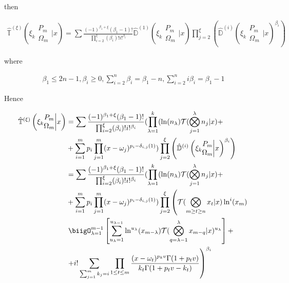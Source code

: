 then 

\begin{align}
      \hat{\mathbb{T}}^{(\xi)}\left( \xi_k \begin{matrix} 
      P_m \\ \Omega_m \end{matrix} \bigg| x  \right) = \sum
      \frac{(-1)^{\beta_1 + \xi}(\beta_1 -1)!}{\prod_{i=2}^\xi 
      (\beta_i)!i!^{\beta_i}} \hat{\mathbb{D}}^{(1)}\left( \xi_k 
      \begin{matrix} P_m \\ \Omega_m \end{matrix} \bigg| x  \right)
      \prod_{j=2}^\xi \left(\hat{\mathbb{D}}^{(i)}\left( \xi_k 
      \begin{matrix} P_m \\ \Omega_m \end{matrix} \bigg| x  
      \right)^{\beta_i}\right)
\end{align}

where

\begin{align}
      \beta_1 \leq 2n-1,  \beta_i \geq 0,  \sum_{i=2}^n 
      \beta_i = \beta_1 - n,   \sum_{i=2}^n i \beta_i = \beta_1 - 1
\end{align}

Hence

\begin{align}
      \hat{\mathbb{T}}^{(\xi)}\left( \xi_k \begin{matrix} P_m \\ 
      \Omega_m \end{matrix} \bigg| x  \right) &= \sum \frac{(-1)^{
      \beta_1 + \xi}(\beta_1 -1)!}{\prod_{i=2}^\xi (\beta_i)!i!^{
      \beta_i}} (\prod_{\lambda = 1}^k (\ln(n_\lambda) \mathcal{T}(
      \bigotimes_{j=1}^\lambda n_j |x) + \\
      &+\sum_{i=1}^m p_i \prod_{j=1}^m (x-\omega_j)^{p_i-\delta_{i,
      j}(1)} )\prod_{j=2}^\xi \left(\hat{\mathbb{D}}^{(i)}\left(
      \xi_k \begin{matrix} P_m \\ \Omega_m \end{matrix} \bigg| x 
      \right)^{\beta_i}\right)\\
      &= \sum \frac{(-1)^{\beta_1 + \xi}(\beta_1 -1)!}{\prod_{i=2}^\xi 
      (\beta_i)!i!^{\beta_i}} (\prod_{\lambda = 1}^k (\ln(n_\lambda)
      \mathcal{T}(\bigotimes_{j=1}^\lambda n_j |x) + \\
      &+\sum_{i=1}^m p_i \prod_{j=1}^m (x-\omega_j)^{p_i-\delta_{i, 
      j}(1)} )\prod_{j=2}^\xi \left(\mathcal{T}(\bigotimes_{m \geq 
      t \geq n}x_t| x) \ln^i (x_m) \right.\\
      &\left. \biigO_{\lambda = 1}^{m-1} \left[\sum_{u_{\lambda}=1}^{u_{
      \lambda-1}}\ln^{u_{\lambda}}(x_{m-\lambda}) \mathcal{T}(\bigotimes_{q
      = \lambda-1}^\lambda x_{m-q} |x)^{u_{\lambda}} \right] + \right.\\
      &\left.+ i! \sum_{\sum_{j=1}^m k_j = i}\prod_{1 \leq t \leq m} 
      \frac{(x - \omega_t)^{p_k v}\Gamma(1+p_t v)}{k_t\Gamma(1+p_t v
      - k_t)}\right)^{\beta_i}
\end{align}
